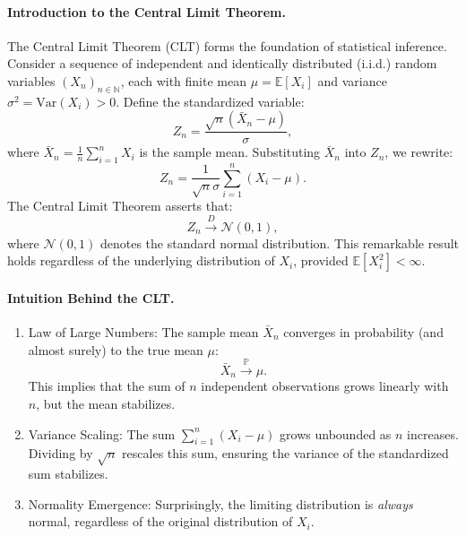 \paragraph{Introduction to the Central Limit Theorem.}
The Central Limit Theorem (CLT) forms the foundation of statistical inference. Consider a sequence of independent and identically distributed (i.i.d.) random variables \((X_n)_{n \in \mathbb{N}}\), each with finite mean \(\mu = \mathbb{E}[X_i]\) and variance \(\sigma^2 = \mathrm{Var}(X_i) > 0\). Define the standardized variable:
\[
Z_n = \frac{\sqrt{n} (\bar{X}_n - \mu)}{\sigma},
\]
where \(\bar{X}_n = \frac{1}{n} \sum_{i=1}^n X_i\) is the sample mean. Substituting \(\bar{X}_n\) into \(Z_n\), we rewrite:
\[
Z_n = \frac{1}{\sqrt{n} \sigma} \sum_{i=1}^n (X_i - \mu).
\]
The Central Limit Theorem asserts that:
\[
Z_n \xrightarrow{D} \mathcal{N}(0, 1),
\]
where \(\mathcal{N}(0, 1)\) denotes the standard normal distribution. This remarkable result holds regardless of the underlying distribution of \(X_i\), provided \(\mathbb{E}[X_i^2] < \infty\).

\paragraph{Intuition Behind the CLT.}
\begin{enumerate}
    \item Law of Large Numbers: The sample mean \(\bar{X}_n\) converges in probability (and almost surely) to the true mean \(\mu\):
   \[
   \bar{X}_n \xrightarrow{\mathbb{P}} \mu.
   \]
   This implies that the sum of \(n\) independent observations grows linearly with \(n\), but the mean stabilizes.
   \item Variance Scaling: The sum \(\sum_{i=1}^n (X_i - \mu)\) grows unbounded as \(n\) increases. Dividing by \(\sqrt{n}\) rescales this sum, ensuring the variance of the standardized sum stabilizes.
   \item Normality Emergence: Surprisingly, the limiting distribution is \emph{always} normal, regardless of the original distribution of \(X_i\).
\end{enumerate}

